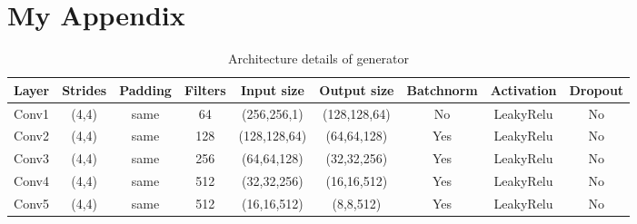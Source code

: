 \documentclass[a4paper,fleqn]{cas-dc}
\begin{document}
\onecolumn
\appendix
\section{My Appendix}

\begin{table}[htbp]
\caption{Architecture details of generator}
\begin{tabular}{|c|c|c|c|c|c|c|c|c|}
\hline
{\color[HTML]{000000} \textbf{Layer}} &
  {\color[HTML]{000000} \textbf{Strides}} &
  {\color[HTML]{000000} \textbf{Padding}} &
  {\color[HTML]{000000} \textbf{Filters}} &
  {\color[HTML]{000000} \textbf{Input size}} &
  {\color[HTML]{000000} \textbf{Output size}} &
  {\color[HTML]{000000} \textbf{Batchnorm}} &
  {\color[HTML]{000000} \textbf{Activation}} &
  {\color[HTML]{000000} \textbf{Dropout}} \\ \hline
{\color[HTML]{000000} Conv1} &
  {\color[HTML]{000000} (4,4)} &
  {\color[HTML]{000000} same} &
  {\color[HTML]{000000} 64} &
  {\color[HTML]{000000} (256,256,1)} &
  {\color[HTML]{000000} (128,128,64)} &
  {\color[HTML]{000000} No} &
  {\color[HTML]{000000} LeakyRelu} &
  {\color[HTML]{000000} No} \\ \hline
{\color[HTML]{000000} Conv2} &
  {\color[HTML]{000000} (4,4)} &
  {\color[HTML]{000000} same} &
  {\color[HTML]{000000} 128} &
  {\color[HTML]{000000} (128,128,64)} &
  {\color[HTML]{000000} (64,64,128)} &
  {\color[HTML]{000000} Yes} &
  {\color[HTML]{000000} LeakyRelu} &
  {\color[HTML]{000000} No} \\ \hline
{\color[HTML]{000000} Conv3} &
  {\color[HTML]{000000} (4,4)} &
  {\color[HTML]{000000} same} &
  {\color[HTML]{000000} 256} &
  {\color[HTML]{000000} (64,64,128)} &
  {\color[HTML]{000000} (32,32,256)} &
  {\color[HTML]{000000} Yes} &
  {\color[HTML]{000000} LeakyRelu} &
  {\color[HTML]{000000} No} \\ \hline
{\color[HTML]{000000} Conv4} &
  {\color[HTML]{000000} (4,4)} &
  {\color[HTML]{000000} same} &
  {\color[HTML]{000000} 512} &
  {\color[HTML]{000000} (32,32,256)} &
  {\color[HTML]{000000} (16,16,512)} &
  {\color[HTML]{000000} Yes} &
  {\color[HTML]{000000} LeakyRelu} &
  {\color[HTML]{000000} No} \\ \hline
{\color[HTML]{000000} Conv5} &
  {\color[HTML]{000000} (4,4)} &
  {\color[HTML]{000000} same} &
  {\color[HTML]{000000} 512} &
  {\color[HTML]{000000} (16,16,512)} &
  {\color[HTML]{000000} (8,8,512)} &
  {\color[HTML]{000000} Yes} &
  {\color[HTML]{000000} LeakyRelu} &
  {\color[HTML]{000000} No} \\ \hline

\end{tabular}
\end{table}
\end{document}
